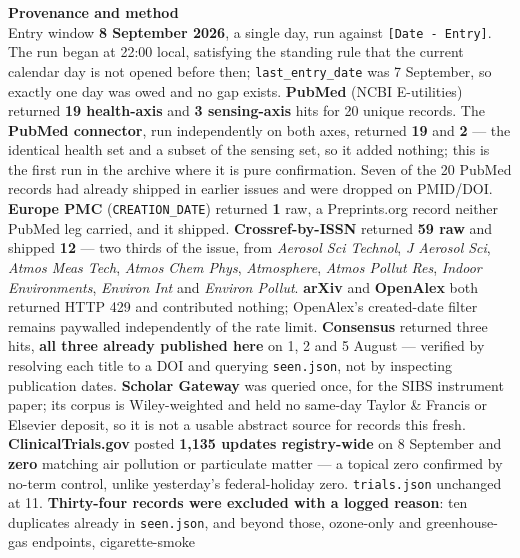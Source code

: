 \documentclass[10pt]{article}
\begin{document}


\vspace{4mm}
\begin{keybox}
{\sffamily\bfseries\footnotesize\color{Deep}Provenance and method}\\[1.2mm]
{\fontsize{7.2}{8.8}\selectfont
Entry window \textbf{8 September 2026}, a single day, run against \texttt{[Date - Entry]}.
The run began at 22:00 local, satisfying the standing rule that the current calendar day is
not opened before then; \texttt{last\_entry\_date} was 7 September, so exactly one day was
owed and no gap exists.
\textbf{PubMed} (NCBI E-utilities) returned \textbf{19 health-axis} and \textbf{3
sensing-axis} hits for 20 unique records. The \textbf{PubMed connector}, run independently on
both axes, returned \textbf{19} and \textbf{2} --- the identical health set and a subset of
the sensing set, so it added nothing; this is the first run in the archive where it is pure
confirmation. Seven of the 20 PubMed records had already shipped in earlier issues and were
dropped on PMID/DOI. \textbf{Europe PMC} (\texttt{CREATION\_DATE}) returned \textbf{1} raw,
a Preprints.org record neither PubMed leg carried, and it shipped. \textbf{Crossref-by-ISSN}
returned \textbf{59 raw} and shipped \textbf{12} --- two thirds of the issue, from
\textit{Aerosol Sci Technol}, \textit{J Aerosol Sci}, \textit{Atmos Meas Tech},
\textit{Atmos Chem Phys}, \textit{Atmosphere}, \textit{Atmos Pollut Res},
\textit{Indoor Environments}, \textit{Environ Int} and \textit{Environ Pollut}.
\textbf{arXiv} and \textbf{OpenAlex} both returned HTTP 429 and contributed nothing;
OpenAlex's created-date filter remains paywalled independently of the rate limit.
\textbf{Consensus} returned three hits, \textbf{all three already published here} on 1, 2 and
5 August --- verified by resolving each title to a DOI and querying \texttt{seen.json}, not
by inspecting publication dates. \textbf{Scholar Gateway} was queried once, for the SIBS
instrument paper; its corpus is Wiley-weighted and held no same-day Taylor \& Francis or
Elsevier deposit, so it is not a usable abstract source for records this fresh.
\textbf{ClinicalTrials.gov} posted \textbf{1{,}135 updates registry-wide} on 8 September and
\textbf{zero} matching air pollution or particulate matter --- a topical zero confirmed by
no-term control, unlike yesterday's federal-holiday zero. \texttt{trials.json} unchanged at 11.
\textbf{Thirty-four records were excluded with a logged reason}: ten duplicates already in
\texttt{seen.json}, and beyond those, ozone-only and greenhouse-gas endpoints, cigarette-smoke
}
\end{keybox}
\end{document}
